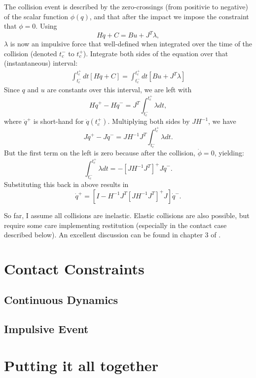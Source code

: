 \documentclass{article}
\begin{document}
The collision event is described by the
zero-crossings (from positivie to negative) of the scalar function
$\phi(q)$, and that after the impact we impose the constraint that
$\phi = 0$.  Using $$H\ddot{q} + C = Bu + J^T \lambda,$$ 
$\lambda$ is now an impulsive force that 
well-defined when integrated over the time of the collision (denoted
$t_c^-$ to $t_c^+$).  Integrate both sides of the equation
over that (instantaneous) interval:
\begin{align*}\int_{t_c^-}^{t_c^+} dt\left[  H \ddot{q} + C \right] =
\int_{t_c^-}^{t_c^+} dt \left[ Bu + J^T \lambda \right]
\end{align*}
Since $q$ and $u$ are constants over this interval, we are left
with
$$H\dot{q}^+ - H\dot{q}^- = J^T \int_{t_c^-}^{t_c^+} \lambda dt,$$ 
where $\dot{q}^+$ is short-hand
for $\dot{q}(t_c^+)$.  Multiplying both sides by $J H^{-1}$, we have 
$$ J \dot{q}^+ - J\dot{q}^- = J H^{-1} J^T \int_{t_c^-}^{t_c^+} \lambda dt.$$
But the first term on the left is zero because after the collision,
$\dot\phi = 0$, yielding:
$$\int_{t_c^-}^{t_c^+} \lambda dt = - \left[ J H^{-1} J^T \right]^+
J \dot{q}^-.$$  Substituting this back in above results in 
$$\dot{q}^+ = \left[ I - H^{-1} J^T \left[ J H^{-1} J^T \right]^+ J
\right] \dot{q}^-.$$

So far, I assume all collisions are inelastic.  Elastic
collisions are also possible, but require some care implementing
restitution (especially in the contact case described below).  An
excellent discussion can be found in chapter 3 of \cite{Mirtich96}.  


\section{Contact Constraints}

\subsection{Continuous Dynamics}

\subsection{Impulsive Event}


\section{Putting it all together}




\end{document}
